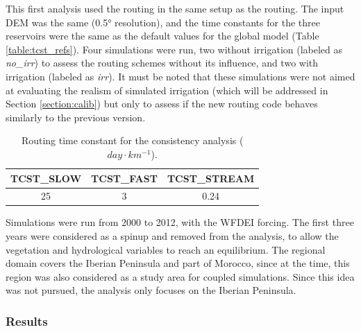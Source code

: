 This first analysis used the \native routing in the same setup as the \std routing. 
The input DEM was the same (0.5° resolution), and the time constants for the three reservoirs were the same as the default values for the global model (Table \ref{table:tcst_refs}). Four simulations were run, two without irrigation (labeled as \textit{no\_irr}) to assess the routing schemes without its influence, and two with irrigation (labeled as \textit{irr}). It must be noted that these simulations were not aimed at evaluating the realism of simulated irrigation (which will be addressed in Section \ref{section:calib}) but only to assess if the new routing code behaves similarly to the previous version.

\begin{table}[h]
\centering
\begin{tabular}{|c|c|c|}
\hline
\textbf{TCST\_SLOW} & \textbf{TCST\_FAST} & \textbf{TCST\_STREAM} \\ \hline
25            & 3             & 0.24            \\ \hline
\end{tabular}
\caption{Routing time constant for the consistency analysis ($day \cdot km^{-1}$).}
\label{table:tcst_consistency}
\end{table}

Simulations were run from 2000 to 2012, with the WFDEI forcing. %
The first three years were considered as a spinup and removed from the analysis, to allow the vegetation and hydrological variables to reach an equilibrium. The regional domain covers the Iberian Peninsula and part of Morocco, since at the time, this region was also considered as a study area for coupled simulations. Since this idea was not pursued, the analysis only focuses on the Iberian Peninsula.

\subsubsection{Results}

